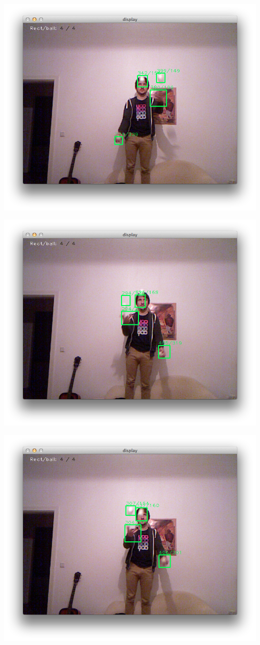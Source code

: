 \documentclass[12pt,a4paper,ngerman]{scrartcl}
\begin{document}
\includegraphics[scale=0.5]{img/rects-2.png}

\includegraphics[scale=0.5]{img/rects-3.png}

\includegraphics[scale=0.5]{img/rects-4.png}
\end{document}
